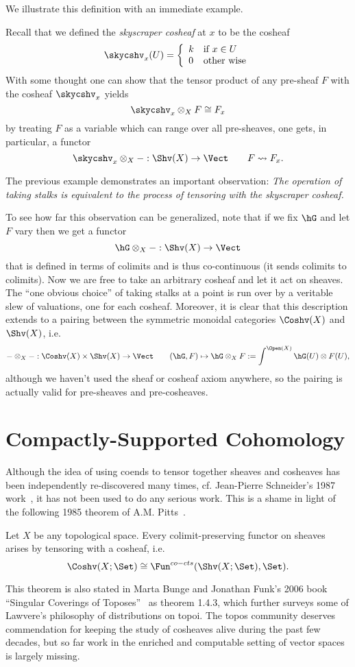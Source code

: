 We illustrate this definition with an immediate example. 
\begin{ex}
Recall that we defined the \emph{skyscraper cosheaf} at $x$ to be the cosheaf
\[
	\skycshv_x(U)=\left\{ \begin{array}{ll} k & \textrm{if $x\in U$}\\
	0 & \textrm{other wise}\end{array} \right.
\]
With some thought one can show that the tensor product of any pre-sheaf $F$ with the cosheaf $\skycshv_x$ yields
\[
	\skycshv_x\otimes_X F \cong F_x
\]
by treating $F$ as a variable which can range over all pre-sheaves, one gets, in particular, a functor
\[
	\skycshv_x\otimes_X - :\Shv(X) \to \Vect \qquad F \rightsquigarrow F_x.
\]
\end{ex}

The previous example demonstrates an important observation: 
\emph{The operation of taking stalks is equivalent to the process of tensoring with the skyscraper cosheaf.} 

To see how far this observation can be generalized, note that if we fix $\hG$ and let $F$ vary then we get a functor
\[
\hG\otimes_X -:\Shv(X)\to\Vect
\]
that is defined in terms of colimits and is thus co-continuous (it sends colimits to colimits). Now we are free to take an arbitrary cosheaf and let it act on sheaves. The ``one obvious choice'' of taking stalks at a point is run over by a veritable slew of valuations, one for each cosheaf. Moreover, it is clear that this description extends to a pairing between the symmetric monoidal categories $\Coshv(X)$ and $\Shv(X)$, i.e.
\[
	-\otimes_X-:\Coshv(X)\times \Shv(X)\to\Vect \qquad (\hG,F)\mapsto \hG\otimes_X F:=\int^{\Open(X)}\hG(U)\otimes F(U),
\]
although we haven't used the sheaf or cosheaf axiom anywhere, so the pairing is actually valid for pre-sheaves and pre-cosheaves.

\section{Compactly-Supported Cohomology}

Although the idea of using coends to tensor together sheaves and cosheaves has been independently re-discovered many times, cf. Jean-Pierre Schneider's 1987 work~\cite{schneiders-ch}, it has not been used to do any serious work. This is a shame in light of the following 1985 theorem of A.M. Pitts~\cite{pitts}.
\begin{thm}
	Let $X$ be any topological space. Every colimit-preserving functor on sheaves arises by tensoring with a cosheaf, i.e. $$\Coshv(X;\Set)\cong\Fun^{co-cts}(\Shv(X;\Set),\Set).$$
\end{thm}
This theorem is also stated in Marta Bunge and Jonathan Funk's 2006 book ``Singular Coverings of Toposes''~\cite{bungefunk} as theorem 1.4.3, which further surveys some of Lawvere's philosophy of distributions on topoi. The topos community deserves commendation for keeping the study of cosheaves alive during the past few decades, but so far work in the enriched and computable setting of vector spaces is largely missing.


